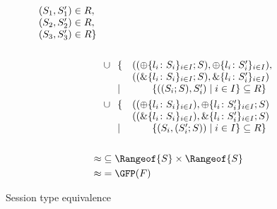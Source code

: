 \begin{figure}[tp]
\begin{align*}
\begin{array}[t]{ll}
          & (S_1, S_1') \in R,\\
          & (S_2, S_2') \in R,\\
          & (S_3, S_3') \in R\}
        \end{array}
    \\
    \\
    & \cup
    \begin{array}[t]{ll}
      \{ & ((\oplus\{l_i\colon S_i\}_{i\in I}; S), \oplus\{l_i\colon
      S_i'\}_{i\in I}),
      \\ & ((\&\{l_i\colon S_i\}_{i\in I}; S), \&\{l_i\colon S_i'\}_{i\in I})
      \\ \mid & \qquad \{ ((S_i; S), S_i') \mid i\in I\} \subseteq R \}
    \end{array}
    \\
    & \cup
    \begin{array}[t]{ll}
      \{ & ((\oplus\{l_i\colon S_i\}_{i\in I}), \oplus\{l_i\colon S_i'\}_{i\in I}; S)
      \\ & ((\&\{l_i\colon S_i\}_{i\in I}), \&\{l_i\colon S_i'\}_{i\in I}; S)
      \\\mid& \qquad \{ (S_i, (S_i';S)) \mid i\in I\} \subseteq R \}
    \end{array}
    \\
    \\
    \approx &\subseteq \Rangeof{S} \times \Rangeof{S} \\
    \approx & = \GFP (F)
  \end{align*}
  \caption{Session type equivalence}
  \label{fig:type-equivalence}
\end{figure}

